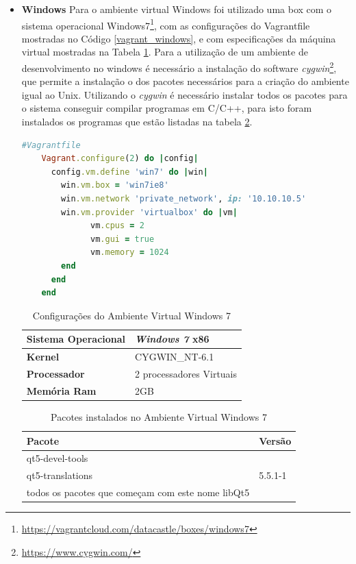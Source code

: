 \begin{itemize}
    \item \textbf{Windows}
        \subitem Para o ambiente virtual Windows foi utilizado uma box com
 o sistema operacional Windows7\footnote{\url{https://vagrantcloud.com/datacastle/boxes/windows7}},
 com as configurações do Vagrantfile mostradas no Código \ref{vagrant_windows},
 e com especificações da máquina virtual mostradas na Tabela \ref{especificacoes_windows}.
 Para a utilização de um ambiente de desenvolvimento no windows é necessário a instalação
 do software \textit{cygwin}\footnote{\url{https://www.cygwin.com/}}, que permite a instalação
o dos pacotes necessários para a criação do ambiente igual ao Unix.
 Utilizando o \textit{cygwin} é necessário instalar todos os pacotes para o sistema 
conseguir compilar programas em C/C++, para isto foram instalados os programas 
que estão listadas na tabela \ref{pacotes_instalados_windows}.

\begin{lstlisting}[language=ruby, caption={Vagrantfile com configurações da máquina virtual Windows 7},
                  label=vagrant_windows]
    #Vagrantfile
    Vagrant.configure(2) do |config|
      config.vm.define 'win7' do |win|
        win.vm.box = 'win7ie8'
        win.vm.network 'private_network', ip: '10.10.10.5'
        win.vm.provider 'virtualbox' do |vm|
              vm.cpus = 2
              vm.gui = true
              vm.memory = 1024
        end
      end
    end
\end{lstlisting}

\begin{table}[h]
\centering
\caption{Configurações do Ambiente Virtual Windows 7}
\label{especificacoes_windows}
\begin{tabular}{ll}
\textbf{Sistema Operacional} & \textit{Windows 7} x86\\ \toprule
\textbf{Kernel} & CYGWIN\_NT-6.1  \\ \midrule 
\textbf{Processador} & 2 processadores Virtuais \\ \midrule
\textbf{Memória Ram} & 2GB  \\ \bottomrule 
\end{tabular} 
\end{table}


\begin{table}[h]
\centering
\caption{Pacotes instalados no Ambiente Virtual Windows 7}
\label{pacotes_instalados_windows}
\begin{tabular}{ll}
\textbf{Pacote} & \textbf{Versão} \\ \toprule
qt5-devel-tools  &  \\ 
qt5-translations & 5.5.1-1  \\ 
todos os pacotes que começam com este nome libQt5 & \\ \midrule


\end{tabular}
\end{table}
\end{itemize}
